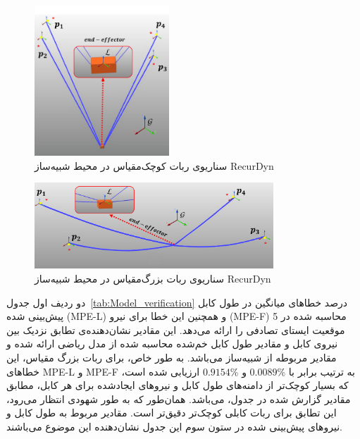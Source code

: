 \begin{figure} [t]
	\centering
	\includegraphics[width=0.45\textwidth]{img/E2_small.pdf}
	\caption{سناریوی ربات کوچک‌مقیاس در محیط شبیه‌ساز RecurDyn}
	\label{fig:recurdyn_small}
\end{figure}

\begin{figure} [b]
	\centering
	\includegraphics[width=0.8\textwidth]{img/E1_large.pdf}
	\caption{سناریوی ربات بزرگ‌مقیاس در محیط شبیه‌ساز RecurDyn}
	\label{fig:recurdyn_large}
\end{figure}

دو ردیف اول جدول~\ref{tab:Model_verification} درصد خطاهای میانگین در طول کابل پیش‌بینی شده (MPE-L) و همچنین این خطا برای نیرو (MPE-F) محاسبه شده در 5 موقعیت ایستای تصادفی را ارائه می‌دهد. این مقادیر نشان‌دهنده‌ی تطابق نزدیک بین نیروی کابل و مقادیر طول کابل خم‌شده محاسبه شده از مدل ریاضی ارائه شده و مقادیر مربوطه از شبیه‌ساز می‌باشد. به طور خاص، برای ربات بزرگ مقیاس، این خطاهای MPE-L و MPE-F به ترتیب برابر با
 $0.0089\%$ 
 و 
 $0.9154\%$ 
 ارزیابی شده است، که بسیار کوچک‌تر از دامنه‌های طول کابل و نیرو‌های ایجادشده برای هر کابل، مطابق مقادیر گزارش شده در جدول، می‌باشد. همان‌طور که به طور شهودی انتظار می‌رود، این تطابق برای ربات کابلی کوچک‌تر دقیق‌تر است. مقادیر مربوط به طول کابل و نیروهای پیش‌بینی شده در ستون سوم این جدول نشان‌دهنده این موضوع می‌باشند.

